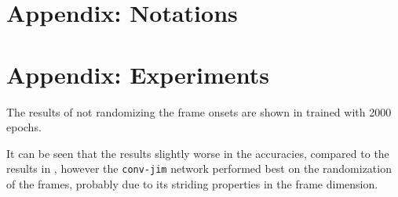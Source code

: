 



\chapter{Appendix: Notations}




\chapter{Appendix: Experiments}


The results of not randomizing the frame onsets are shown in  trained with 2000 epochs.

It can be seen that the results slightly worse in the accuracies, compared to the results in ,
however the \texttt{conv-jim} network performed best on the randomization of the frames, probably due to its striding properties in the frame dimension.
